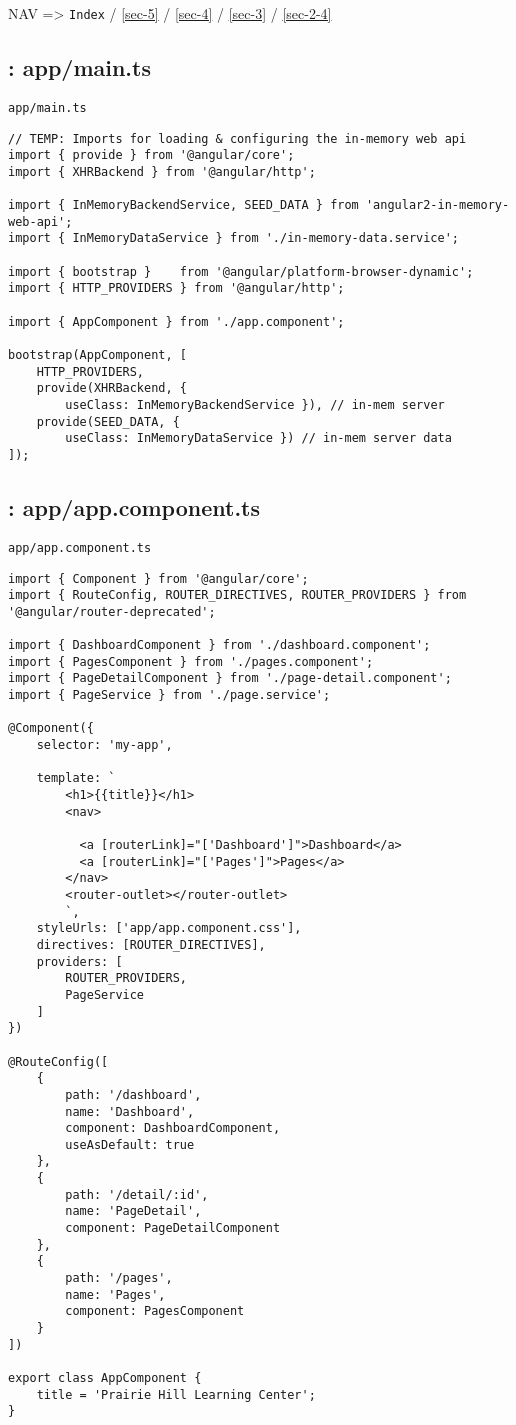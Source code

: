 \documentclass[11pt]{article}
\begin{document}
NAV => \texttt{Index} / \ref{sec-5} / \ref{sec-4} / \ref{sec-3} / \ref{sec-2-4}

\subsection{: app/main.ts}
\label{sec-2-1}
\begin{verbatim}
app/main.ts
\end{verbatim}
\begin{verbatim}
// TEMP: Imports for loading & configuring the in-memory web api
import { provide } from '@angular/core';
import { XHRBackend } from '@angular/http';

import { InMemoryBackendService, SEED_DATA } from 'angular2-in-memory-web-api';
import { InMemoryDataService } from './in-memory-data.service';

import { bootstrap }    from '@angular/platform-browser-dynamic';
import { HTTP_PROVIDERS } from '@angular/http';

import { AppComponent } from './app.component';

bootstrap(AppComponent, [
    HTTP_PROVIDERS,
    provide(XHRBackend, {
        useClass: InMemoryBackendService }), // in-mem server
    provide(SEED_DATA, {
        useClass: InMemoryDataService }) // in-mem server data
]);
\end{verbatim}

\subsection{: app/app.component.ts}
\label{sec-2-2}
\begin{verbatim}
app/app.component.ts
\end{verbatim}
\begin{verbatim}
import { Component } from '@angular/core';
import { RouteConfig, ROUTER_DIRECTIVES, ROUTER_PROVIDERS } from '@angular/router-deprecated';

import { DashboardComponent } from './dashboard.component';
import { PagesComponent } from './pages.component';
import { PageDetailComponent } from './page-detail.component';
import { PageService } from './page.service';

@Component({
    selector: 'my-app',

    template: `
        <h1>{{title}}</h1>
        <nav>

          <a [routerLink]="['Dashboard']">Dashboard</a>
          <a [routerLink]="['Pages']">Pages</a>
        </nav>
        <router-outlet></router-outlet>
        `,
    styleUrls: ['app/app.component.css'],
    directives: [ROUTER_DIRECTIVES],
    providers: [
        ROUTER_PROVIDERS,
        PageService
    ]
})

@RouteConfig([
    {
        path: '/dashboard',
        name: 'Dashboard',
        component: DashboardComponent,
        useAsDefault: true
    },
    {
        path: '/detail/:id',
        name: 'PageDetail',
        component: PageDetailComponent
    },
    {
        path: '/pages',
        name: 'Pages',
        component: PagesComponent
    }
])

export class AppComponent {
    title = 'Prairie Hill Learning Center';
}
\end{verbatim}
\end{document}
